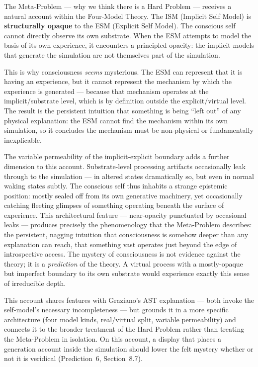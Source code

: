 \documentclass[12pt]{article}
\begin{document}
The Meta-Problem --- why we think there is a Hard Problem --- receives a natural account within the Four-Model Theory. The ISM (Implicit Self Model) is \textbf{structurally opaque} to the ESM (Explicit Self Model). The conscious self cannot directly observe its own substrate. When the ESM attempts to model the basis of its own experience, it encounters a principled opacity: the implicit models that generate the simulation are not themselves part of the simulation.

This is why consciousness \emph{seems} mysterious. The ESM can represent that it is having an experience, but it cannot represent the mechanism by which the experience is generated --- because that mechanism operates at the implicit/substrate level, which is by definition outside the explicit/virtual level. The result is the persistent intuition that something is being ``left out'' of any physical explanation: the ESM cannot find the mechanism within its own simulation, so it concludes the mechanism must be non-physical or fundamentally inexplicable.

The variable permeability of the implicit-explicit boundary adds a further dimension to this account. Substrate-level processing artifacts occasionally leak through to the simulation --- in altered states dramatically so, but even in normal waking states subtly. The conscious self thus inhabits a strange epistemic position: mostly sealed off from its own generative machinery, yet occasionally catching fleeting glimpses of something operating beneath the surface of experience. This architectural feature --- near-opacity punctuated by occasional leaks --- produces precisely the phenomenology that the Meta-Problem describes: the persistent, nagging intuition that consciousness is somehow deeper than any explanation can reach, that something vast operates just beyond the edge of introspective access. The mystery of consciousness is not evidence against the theory; it is a \emph{prediction} of the theory. A virtual process with a mostly-opaque but imperfect boundary to its own substrate would experience exactly this sense of irreducible depth.

This account shares features with Graziano's AST explanation --- both invoke the self-model's necessary incompleteness --- but grounds it in a more specific architecture (four model kinds, real/virtual split, variable permeability) and connects it to the broader treatment of the Hard Problem rather than treating the Meta-Problem in isolation. On this account, a display that places a generation account inside the simulation should lower the felt mystery whether or not it is veridical (Prediction~6, Section~8.7).
\end{document}
